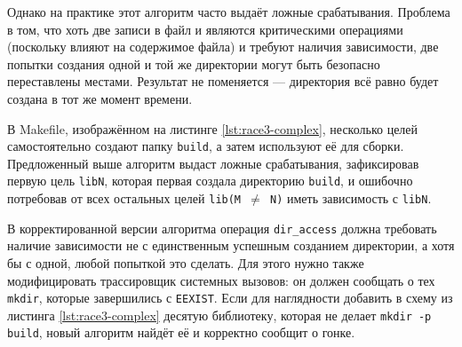 
Однако на практике этот алгоритм часто выдаёт ложные срабатывания. Проблема в том, что хоть две записи в файл и являются критическими операциями (поскольку влияют на содержимое файла) и требуют наличия зависимости, две попытки создания одной и той же директории могут быть безопасно переставлены местами. Результат не поменяется --- директория всё равно будет создана в тот же момент времени.



В Makefile, изображённом на листинге \ref{lst:race3-complex}, несколько целей самостоятельно создают папку \texttt{build}, а затем используют её для сборки. Предложенный выше алгоритм выдаст ложные срабатывания, зафиксировав первую цель \texttt{libN}, которая первая создала директорию \texttt{build}, и ошибочно потребовав от всех остальных целей \texttt{lib(M $\ne$ N)} иметь зависимость с \texttt{libN}.

В корректированной версии алгоритма операция \texttt{dir\_access} должна требовать наличие зависимости не с единственным успешным созданием директории, а хотя бы с одной, любой попыткой это сделать. Для этого нужно также модифицировать трассировщик системных вызовов: он должен сообщать о тех \texttt{mkdir}, которые завершились с \texttt{EEXIST}. Если для наглядности добавить в схему из листинга \ref{lst:race3-complex} десятую библиотеку, которая не делает \texttt{mkdir -p build}, новый алгоритм найдёт её и корректно сообщит о гонке.

